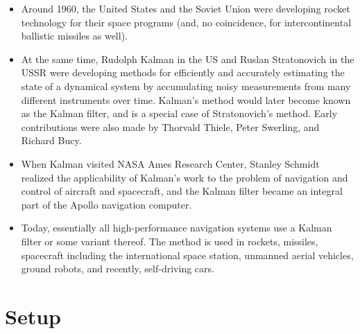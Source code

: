 \documentclass[12pt]{article}
\begin{document}
\begin{itemize}
\item Around 1960, the United States and the Soviet Union were developing rocket technology for their space programs (and, no coincidence, for intercontinental ballistic missiles as well).
\item At the same time, Rudolph Kalman in the US and Ruslan Stratonovich in the USSR were developing methods for efficiently and accurately estimating the state of a dynamical system by accumulating noisy measurements from many different instruments over time. Kalman's method would later become known as the Kalman filter, and is a special case of Stratonovich's method.  Early contributions were also made by Thorvald Thiele, Peter Swerling, and Richard Bucy.
\item When Kalman visited NASA Ames Research Center, Stanley Schmidt realized the applicability of Kalman's work to the problem of navigation and control of aircraft and spacecraft, and the Kalman filter became an integral part of the Apollo navigation computer.
\item Today, essentially all high-performance navigation systems use a Kalman filter or some variant thereof.  The method is used in rockets, missiles, spacecraft including the international space station, unmanned aerial vehicles, ground robots, and recently, self-driving cars.
\end{itemize}


\section{Setup}
\end{document}
